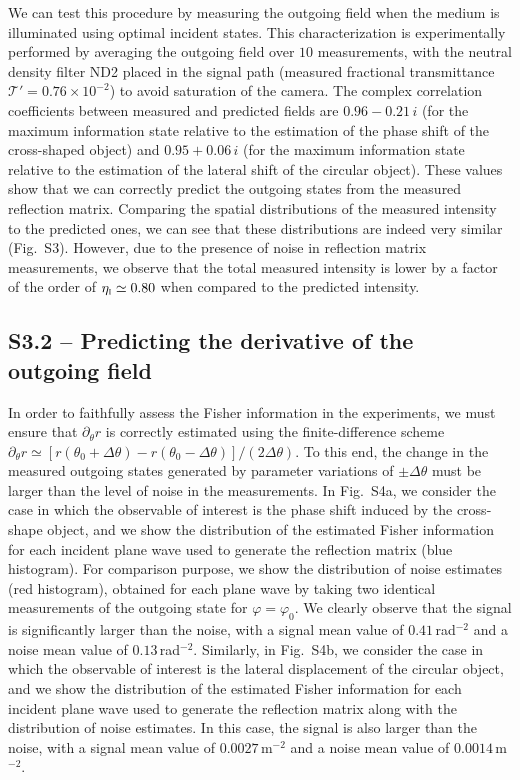 \documentclass[aps,pra,twocolumn,amsmath,amssymb,superscriptaddress,10pt,nobibnotes]{revtex4-2}
\begin{document}
We can test this procedure by measuring the outgoing field when the medium is illuminated using optimal incident states. This characterization is experimentally performed by averaging the outgoing field over $10$ measurements, with the neutral density filter ND2 placed in the signal path (measured fractional transmittance $\mathcal{T}'=0.76 \times 10^{-2}$) to avoid saturation of the camera. The complex correlation coefficients between measured and predicted fields are $0.96-0.21 \, i$ (for the maximum information state relative to the estimation of the phase shift of the cross-shaped object) and $0.95+0.06 \, i$ (for the maximum information state relative to the estimation of the lateral shift of the circular object). These values show that we can correctly predict the outgoing states from the measured reflection matrix. Comparing the spatial distributions of the measured intensity to the predicted ones, we can see that these distributions are indeed very similar (Fig.~S3). However, due to the presence of noise in reflection matrix measurements, we observe that the total measured intensity is lower by a factor of the order of $\eta_\textsc{i}\simeq0.80$ when compared to the predicted intensity.



\subsection*{S3.2 -- Predicting the derivative of the outgoing field}

In order to faithfully assess the Fisher information in the experiments, we must ensure that $\partial_\theta r$ is correctly estimated using the finite-difference scheme $\partial_\theta r \simeq [r(\theta_0+\Delta \theta) - r(\theta_0-\Delta \theta)]/( 2 \Delta \theta)$. To this end, the change in the measured outgoing states generated by parameter variations of $\pm \Delta \theta$ must be larger than the level of noise in the measurements. In Fig.~S4a, we consider the case in which the observable of interest is the phase shift induced by the cross-shape object, and we show the distribution of the estimated Fisher information for each incident plane wave used to generate the reflection matrix (blue histogram). For comparison purpose, we show the distribution of noise estimates (red histogram), obtained for each plane wave by taking two identical measurements of the outgoing state for $\varphi=\varphi_0$. We clearly observe that the signal is significantly larger than the noise, with a signal mean value of $0.41$\,rad$^{-2}$ and a noise mean value of $0.13$\,rad$^{-2}$. Similarly, in Fig.~S4b, we consider the case in which the observable of interest is the lateral displacement of the circular object, and we show the distribution of the estimated Fisher information for each incident plane wave used to generate the reflection matrix along with the distribution of noise estimates. In this case, the signal is also larger than the noise, with a signal mean value of $0.0027$\,\textmu m$^{-2}$ and a noise mean value of $0.0014$\,\textmu m$^{-2}$.
\end{document}

